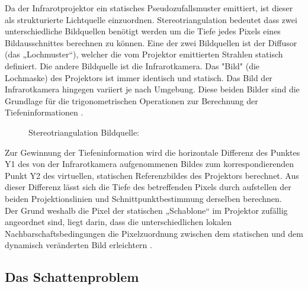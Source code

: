 Da der Infrarotprojektor ein statisches Pseudozufallsmuster emittiert, ist dieser als strukturierte Lichtquelle einzuordnen.
Stereotriangulation bedeutet dass zwei unterschiedliche Bildquellen benötigt werden um die Tiefe jedes Pixels eines Bildausschnittes berechnen zu können.
Eine der zwei Bildquellen ist der Diffusor (das „Lochmuster“), welcher die vom Projektor emittierten Strahlen statisch definiert. Die andere Bildquelle ist die Infrarotkamera.
Das "Bild" (die Lochmaske) des Projektors ist immer identisch und statisch. Das Bild der Infrarotkamera hingegen variiert je nach Umgebung. Diese beiden Bilder sind die Grundlage für die trigonometrischen Operationen zur Berechnung der Tiefeninformationen \cite{structured light}.

\begin{figure}[!ht]
  \centering
   \caption{ Stereotriangulation Bildquelle:\cite{stereotriangluation}}
\end{figure}
Zur Gewinnung der Tiefeninformation wird die horizontale Differenz des Punktes Y1 des von der Infrarotkamera aufgenommenen Bildes zum korrespondierenden Punkt Y2 des virtuellen, statischen Referenzbildes des Projektors berechnet. Aus dieser Differenz lässt sich die Tiefe des betreffenden Pixels durch aufstellen der beiden Projektionslinien und Schnittpunktbestimmung derselben berechnen. \\
Der Grund weshalb die Pixel der statischen „Schablone“ im Projektor zufällig angeordnet sind, liegt darin, dass die unterschiedlichen lokalen Nachbarschaftsbedingungen die Pixelzuordnung zwischen dem statischen und dem dynamisch veränderten Bild erleichtern \cite{primesense}.


\subsection{Das Schattenproblem}

